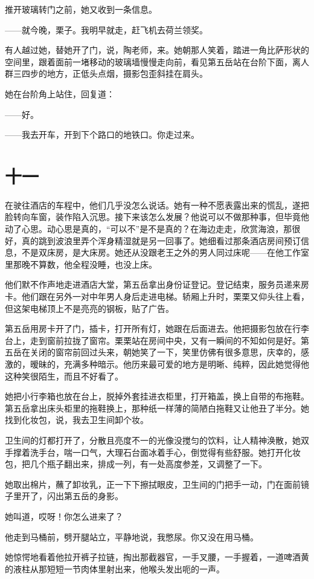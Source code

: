 \documentclass[lang=cn,newtx,12pt,scheme=chinese]{elegantbook}
\begin{document}
推开玻璃转门之前，她又收到一条信息。

——就今晚，栗子。我明早就走，赶飞机去荷兰领奖。

有人越过她，替她开了门，说，陶老师，来。她朝那人笑着，踏进一角比萨形状的空间里，跟着面前一堵移动的玻璃墙慢慢走向前，看见第五岳站在台阶下面，离人群三四步的地方，正低头点烟，摄影包歪斜挂在肩头。

她在台阶角上站住，回复道：

——好。

——我去开车，开到下个路口的地铁口。你走过来。
\section{十一}
在驶往酒店的车程中，他们几乎没怎么说话。她有一种不愿表露出来的慌乱，遂把脸转向车窗，装作陷入沉思。接下来该怎么发展？他说可以不做那种事，但毕竟他动了心思。动心思是真的，“可以不”是不是真的？在海边走走，欣赏海浪，那很好，真的跳到波浪里弄个浑身精湿就是另一回事了。她细看过那条酒店房间预订信息，不是双床房，是大床房。她还从没跟老王之外的男人同过床呢——在他工作室里那晚不算数，他全程没睡，也没上床。

他们默不作声地走进酒店大堂，第五岳拿出身份证登记。登记结束，服务员递来房卡。他们跟在另外一对中年男人身后走进电梯。轿厢上升时，栗栗又仰头往上看，但这架电梯顶上不是亮亮的钢板，贴了广告。

第五岳用房卡开了门，插卡，打开所有灯，她跟在后面进去。他把摄影包放在行李台上，走到窗前拉拢了窗帘。栗栗站在房间中央，又有一瞬间的不知如何是好。第五岳在关闭的窗帘前回过头来，朝她笑了一下，笑里仿佛有很多意思，庆幸的，感激的，暧昧的，充满多种暗示。他历来最可爱的地方是明晰、纯粹，因此她觉得他这种笑很陌生，而且不好看了。

她把小行李箱也放在台上，脱掉外套挂进衣柜里，打开箱盖，换上自带的布拖鞋。第五岳拿出床头柜里的拖鞋换上，那种纸一样薄的简陋白拖鞋又让他丑了半分。她找到化妆包，说，我去卫生间卸个妆。

卫生间的灯都打开了，分散且亮度不一的光像没搅匀的饮料，让人精神涣散，她双手撑着洗手台，喘一口气，大理石台面冰着手心，倒觉得有些舒服。她打开化妆包，把几个瓶子翻出来，排成一列，有一处高度参差，又调整了一下。

她取出棉片，蘸了卸妆乳，正一下下擦拭眼皮，卫生间的门把手一动，门在面前镜子里开了，闪出第五岳的身影。

她叫道，哎呀！你怎么进来了？

他走到马桶前，劈开腿站立，平静地说，我憋尿。你又没在用马桶。

她惊愕地看着他拉开裤子拉链，掏出那截器官，一手叉腰，一手握着，一道啤酒黄的液柱从那短短一节肉体里射出来，他喉头发出呃的一声。
\end{document}
